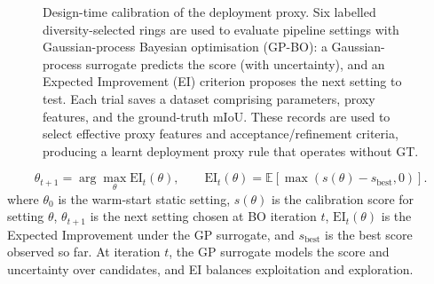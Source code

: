 \documentclass[a4paper,fleqn]{cas-dc}
\begin{document}
{\begin{figure}[t]

\caption{
Design-time calibration of the deployment proxy. Six labelled diversity-selected rings are used to evaluate pipeline settings with Gaussian-process Bayesian optimisation (GP-BO): a Gaussian-process surrogate predicts the score (with uncertainty), and an Expected Improvement (EI) criterion proposes the next setting to test. Each trial saves a dataset comprising parameters, proxy features, and the ground-truth mIoU. These records are used to select effective proxy features and acceptance/refinement criteria, producing a learnt deployment proxy rule that operates without GT.
}
\label{fig:bo_proxy_calibration}
\end{figure}
\FloatBarrier %
\clearpage %


\par\noindent\begin{minipage}{\columnwidth}
\begin{equation}
\theta_{t+1}
= \arg\max_{\theta} \mathrm{EI}_t(\theta),
\qquad
\mathrm{EI}_t(\theta)
= \mathbb{E}\left[\max\left(s(\theta)-s_{\mathrm{best}},0\right)\right].
\label{eq:expected_improvement}
\end{equation}
where $\theta_0$ is the warm-start static setting, $s(\theta)$ is the calibration score for setting $\theta$, $\theta_{t+1}$ is the next setting chosen at BO iteration $t$, $\mathrm{EI}_t(\theta)$ is the Expected Improvement under the GP surrogate, and $s_{\mathrm{best}}$ is the best score observed so far. At iteration $t$, the GP surrogate models the score and uncertainty over candidates, and EI balances exploitation and exploration.


\end{minipage}}
\end{document}
